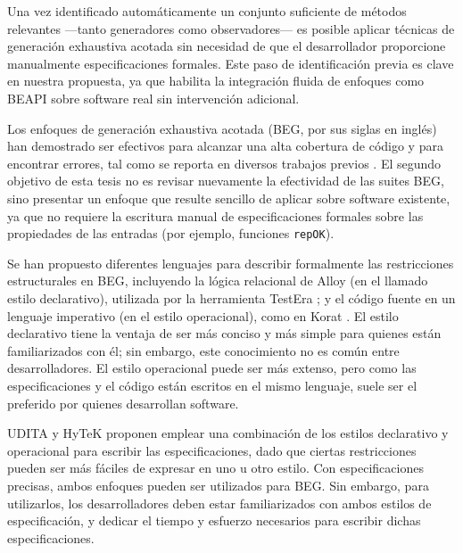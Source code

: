 Una vez identificado automáticamente un conjunto suficiente de métodos relevantes —tanto generadores como observadores— es posible aplicar técnicas de generación 
exhaustiva acotada sin necesidad de que el desarrollador proporcione manualmente especificaciones formales. Este paso de identificación previa es clave en nuestra 
propuesta, ya que habilita la integración fluida de enfoques como \textsf{BEAPI} sobre software real sin intervención adicional. 

Los enfoques de generación exhaustiva acotada (BEG, por sus siglas en inglés) han demostrado ser efectivos para alcanzar una alta cobertura de código y para 
encontrar errores, tal como se reporta en diversos trabajos previos \cite{Marinov01,Khurshid01,Boyapati02,Sullivan04}. El segundo objetivo de esta tesis no es 
revisar nuevamente la efectividad de las suites BEG, sino presentar un enfoque que resulte sencillo de aplicar sobre software existente, ya que no requiere 
la escritura manual de especificaciones formales sobre las propiedades de las entradas (por ejemplo, funciones \texttt{repOK}).

Se han propuesto diferentes lenguajes para describir formalmente las restricciones estructurales en BEG, incluyendo la lógica relacional de Alloy (en el llamado 
estilo declarativo), utilizada por la herramienta \textsf{TestEra} \cite{Marinov01}; y el código fuente en un lenguaje imperativo (en el estilo operacional), como en 
\textsf{Korat} \cite{Boyapati02}. El estilo declarativo tiene la ventaja de ser más conciso y más simple para quienes están familiarizados con él; sin embargo, 
este conocimiento no es común entre desarrolladores. El estilo operacional puede ser más extenso, pero como las especificaciones y el código están escritos en el 
mismo lenguaje, suele ser el preferido por quienes desarrollan software.

\textsf{UDITA} \cite{Gligoric10} y \textsf{HyTeK} \cite{Rosner14} proponen emplear una combinación de los estilos declarativo y operacional para escribir las 
especificaciones, dado que ciertas restricciones pueden ser más fáciles de expresar 
en uno u otro estilo. Con especificaciones precisas, ambos enfoques pueden ser utilizados para BEG. Sin embargo, para utilizarlos, los desarrolladores deben 
estar familiarizados con ambos estilos de especificación, y dedicar el tiempo y esfuerzo necesarios para escribir dichas especificaciones.


